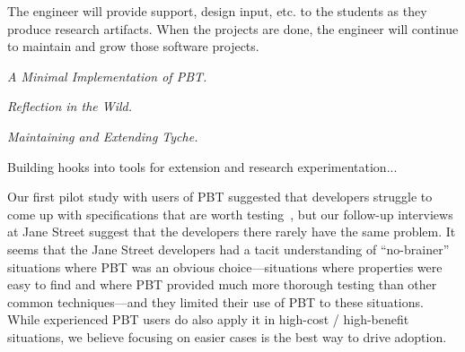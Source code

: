 



\ifnext
The engineer will provide support, design input, etc. to the students as they
produce research artifacts. When the projects are done, the engineer will
continue to maintain and grow those software projects.

{\em A Minimal Implementation of PBT.}

{\em Reflection in the Wild.}


{\em Maintaining and Extending Tyche.}

Building hooks into tools for extension and research experimentation...
\fi



%
Our first pilot study with users of PBT suggested that developers struggle to
come up with specifications that are worth
testing~\cite{goldstein_problems_2022},
but
our follow-up interviews at Jane Street suggest that the developers there
rarely have the same problem. It seems that the Jane Street developers had
a tacit
understanding of ``no-brainer'' situations where PBT was an obvious
choice---situations where properties were easy to find and where PBT provided
much more thorough testing than other common techniques---and they limited their
use of PBT to these situations.
While experienced PBT users do also apply it in
high-cost / high-benefit situations, we believe
focusing on easier cases is the best way to drive adoption.

